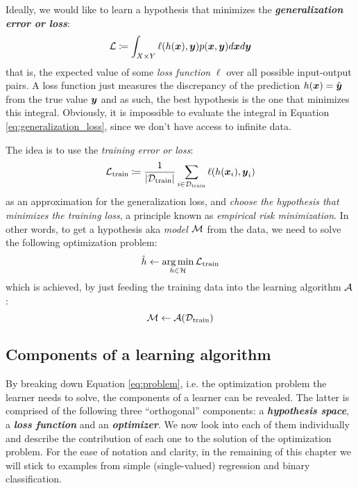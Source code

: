 Ideally, we would like to learn a hypothesis that minimizes the
\emph{\textbf{generalization error or loss}}:
\begin{equation}
	\label{eq:generalization_loss}
	\mathcal{L} \coloneqq \int_{X \times Y} \ell(h(\boldsymbol{x}), \boldsymbol{y}) p(\boldsymbol{x}, \boldsymbol{y}) d\boldsymbol{x} d\boldsymbol{y}
\end{equation}
that is, the expected value of some \emph{loss function}
$\ell$ over all possible input-output pairs. A loss function just measures the
discrepancy of the prediction $h(\boldsymbol{x}) = \hat{\boldsymbol{y}}$ from the true value $\boldsymbol{y}$
and as such, the best hypothesis is the one that minimizes this integral.
Obviously, it is impossible to evaluate the integral in Equation
\ref{eq:generalization_loss}, since we don't have access to infinite data.

The idea is to use the \emph{training error or loss}:
\begin{equation}
	\label{eq:training_loss}
	\mathcal{L}_\text{train} \coloneqq \frac{1}{\lvert \mathcal{D}_\text{train} \rvert} \sum_{i \in \mathcal{D}_\text{train}}
	\ell(h(\boldsymbol{x}_i), \boldsymbol{y}_i)
\end{equation}
as an approximation for the generalization loss, and \emph{choose the hypothesis
that minimizes the training loss}, a principle known as \emph{empirical risk
minimization}. In other words, to get a
hypothesis aka \emph{model} $\mathcal{M}$ from the data, we need to
solve the following optimization problem:
\begin{equation}
	\label{eq:problem}
	\hat{h} \gets \operatorname*{arg\,min}_{h \in \mathcal{H}} \mathcal{L}_\text{train}
\end{equation}
which is achieved, by just feeding the training data into the learning
algorithm $\mathcal{A}$:
\begin{equation}
	\label{eq:learner}
	\mathcal{M} \gets \mathcal{A}(\mathcal{D}_\text{train})
\end{equation}

\subsection{Components of a learning algorithm}

By breaking down Equation \ref{eq:problem}, i.e. the optimization problem the
learner needs to solve, the components of a learner can be revealed. The latter
is comprised of the following three ``orthogonal'' components: a
\emph{\textbf{hypothesis space}}, a \emph{\textbf{loss
function}} and an \emph{\textbf{optimizer}}. We now look into each of them
individually and describe the contribution of each one to the solution of the
optimization problem. For the ease of notation and clarity, in the remaining of
this chapter we will stick to examples from simple (single-valued) regression
and binary classification.

